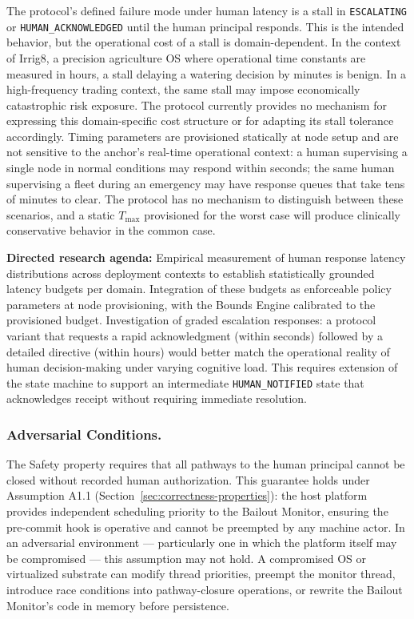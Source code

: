 The protocol's defined failure mode under human latency is a stall in \texttt{ESCALATING} or \texttt{HUMAN\_ACKNOWLEDGED} until the human principal responds. This is the intended behavior, but the operational cost of a stall is domain-dependent. In the context of Irrig8, a precision agriculture OS where operational time constants are measured in hours, a stall delaying a watering decision by minutes is benign. In a high-frequency trading context, the same stall may impose economically catastrophic risk exposure. The protocol currently provides no mechanism for expressing this domain-specific cost structure or for adapting its stall tolerance accordingly. Timing parameters are provisioned statically at node setup and are not sensitive to the anchor's real-time operational context: a human supervising a single node in normal conditions may respond within seconds; the same human supervising a fleet during an emergency may have response queues that take tens of minutes to clear. The protocol has no mechanism to distinguish between these scenarios, and a static $T_{\max}$ provisioned for the worst case will produce clinically conservative behavior in the common case.

\textbf{Directed research agenda:} Empirical measurement of human response latency distributions across deployment contexts to establish statistically grounded latency budgets per domain. Integration of these budgets as enforceable policy parameters at node provisioning, with the Bounds Engine calibrated to the provisioned budget. Investigation of graded escalation responses: a protocol variant that requests a rapid acknowledgment (within seconds) followed by a detailed directive (within hours) would better match the operational reality of human decision-making under varying cognitive load. This requires extension of the state machine to support an intermediate \texttt{HUMAN\_NOTIFIED} state that acknowledges receipt without requiring immediate resolution.

\subsubsection{Adversarial Conditions.}\label{sec:adversarial-limitations}

The Safety property requires that all pathways to the human principal cannot be closed without recorded human authorization. This guarantee holds under Assumption A1.1 (Section~\ref{sec:correctness-properties}): the host platform provides independent scheduling priority to the Bailout Monitor, ensuring the pre-commit hook is operative and cannot be preempted by any machine actor. In an adversarial environment --- particularly one in which the platform itself may be compromised --- this assumption may not hold. A compromised OS or virtualized substrate can modify thread priorities, preempt the monitor thread, introduce race conditions into pathway-closure operations, or rewrite the Bailout Monitor's code in memory before persistence.

